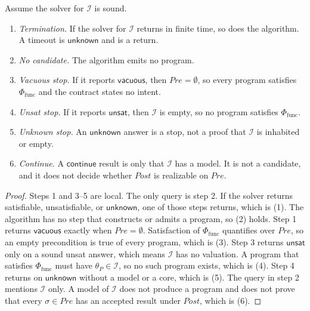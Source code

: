 \begin{lemma}
\label{lem:checkrealiz}
Assume the solver for \(\mathcal{I}\) is sound.
\begin{enumerate}
  \item \emph{Termination.} If the solver for \(\mathcal{I}\) returns in
  finite time, so does the algorithm. A timeout is \(\mathsf{unknown}\) and
  is a return.
  \item \emph{No candidate.} The algorithm emits no program.
  \item \emph{Vacuous stop.} If it reports \(\mathsf{vacuous}\), then
  \(\mathit{Pre} = \emptyset\), so every program satisfies
  \(\Phi_{\text{func}}\) and the contract states no intent.
  \item \emph{Unsat stop.} If it reports \(\mathsf{unsat}\), then
  \(\mathcal{I}\) is empty, so no program satisfies
  \(\Phi_{\text{func}}\).
  \item \emph{Unknown stop.} An \(\mathsf{unknown}\) answer is a stop, not a
  proof that \(\mathcal{I}\) is inhabited or empty.
  \item \emph{Continue.} A \(\mathsf{continue}\) result is only that
  \(\mathcal{I}\) has a model. It is not a candidate, and it does not decide
  whether \(\mathit{Post}\) is realizable on \(\mathit{Pre}\).
\end{enumerate}
\end{lemma}
\begin{proof}
Steps 1 and 3--5 are local. The only query is step 2. If the solver
returns satisfiable, unsatisfiable, or \(\mathsf{unknown}\), one of those
steps returns, which is (1). The algorithm has no step that constructs or
admits a program, so (2) holds. Step 1 returns \(\mathsf{vacuous}\) exactly
when \(\mathit{Pre} = \emptyset\). Satisfaction of \(\Phi_{\text{func}}\)
quantifies over \(\mathit{Pre}\), so an empty precondition is true of every
program, which is (3). Step 3 returns \(\mathsf{unsat}\) only on a sound
unsat answer, which means \(\mathcal{I}\) has no valuation. A program that
satisfies \(\Phi_{\text{func}}\) must have \(\theta_P \in \mathcal{I}\), so
no such program exists, which is (4). Step 4 returns on
\(\mathsf{unknown}\) without a model or a core, which is (5). The query in
step 2 mentions \(\mathcal{I}\) only. A model of \(\mathcal{I}\) does not
produce a program and does not prove that every \(\sigma \in \mathit{Pre}\)
has an accepted result under \(\mathit{Post}\), which is (6).
\end{proof}

